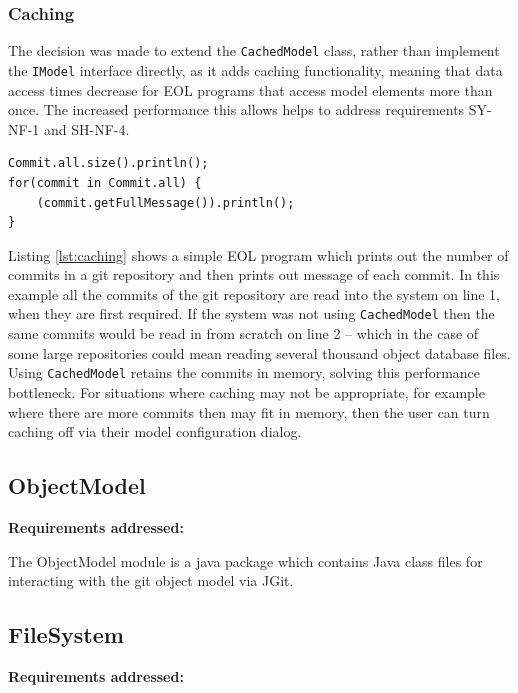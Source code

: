 \documentclass[11pt]{book}
\newcommand{\code}[1]{\texttt{#1}}
\begin{document}
\subsubsection{Caching}
The decision was made to extend the \code{CachedModel} class, rather than implement the \code{IModel} interface directly, as it adds caching functionality, meaning that data access times decrease for EOL programs that access model elements more than once. The increased performance this allows helps to address requirements SY-NF-1 and SH-NF-4. \\

\begin{lstlisting}[caption=EOL Code benefiting from caching, label=lst:caching]
Commit.all.size().println();
for(commit in Commit.all) {
	(commit.getFullMessage()).println();
}
\end{lstlisting}

Listing \ref{lst:caching} shows a simple EOL program which prints out the number of commits in a git repository and then prints out message of each commit. In this example all the commits of the git repository are read into the system on line 1, when they are first required. If the system was not using \code{CachedModel} then the same commits would be read in from scratch on line 2 -- which in the case of some large repositories could mean reading several thousand object database files. Using \code{CachedModel} retains the commits in memory, solving this performance bottleneck. For situations where caching may not be appropriate, for example where there are more commits then may fit in memory, then the user can turn caching off via their model configuration dialog.



\subsection{ObjectModel}
\begin{tcolorbox}
\textbf{Requirements addressed:}
\end{tcolorbox}

The ObjectModel module is a java package which contains Java class files for interacting with the git object model via JGit. 

\subsection{FileSystem}
\begin{tcolorbox}
\textbf{Requirements addressed:}
\end{tcolorbox}
\end{document}
